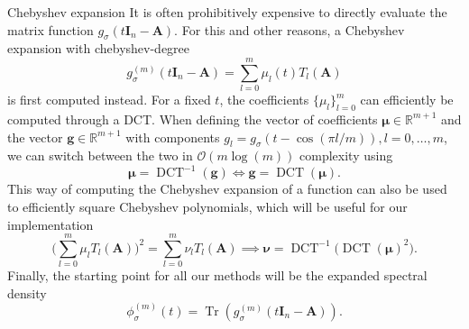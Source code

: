 \documentclass[final, leqno, 12pt]{beamer}
\newcommand{\mtx}[1]{\boldsymbol{#1}}
\newcommand{\vct}[1]{\boldsymbol{#1}}
\DeclareMathOperator{\Tr}{Tr}
\DeclareMathOperator{\DCT}{DCT}
\begin{document}
\begin{frame}[t]
\begin{columns}[t]
\begin{column}{0.45\paperwidth}
        \begin{block}{Chebyshev expansion}
            It is often prohibitively expensive to directly
            evaluate the matrix function $g_{\sigma}(t\mtx{I}_n - \mtx{A})$.
            For this and other reasons, a Chebyshev expansion with \gls{chebyshev-degree}
            \begin{equation}
                g_{\sigma}^{(m)}(t \mtx{I}_n - \mtx{A}) = \sum_{l=0}^{m} \mu_l(t) T_l(\mtx{A})
                \label{equ:chebyshev-expansion}
            \end{equation}
            is first computed instead. For a fixed $t$, the coefficients $\{\mu_l\}_{l=0}^m$ can
            efficiently be computed through a \gls{DCT}.
            When defining the vector of coefficients $\vct{\mu} \in \mathbb{R}^{m+1}$
            and the vector $\vct{g} \in \mathbb{R}^{m+1}$ with components
            $g_l = g_{\sigma}(t - \cos(\pi l / m)), l=0, \dots, m$, we can
            switch between the two in $\mathcal{O}(m \log(m))$ complexity using
            \begin{equation}
                \vct{\mu} = \DCT^{-1}(\vct{g}) \iff \vct{g} = \DCT(\vct{\mu}).
                \label{equ:DCT}
            \end{equation}
            This way of computing the Chebyshev expansion of a function
            can also be used to efficiently square Chebyshev polynomials,
            which will be useful for our implementation
            \begin{equation}
                \big(\sum_{l=0}^{m} \mu_l T_l(\mtx{A})\big)^2 = \sum_{l=0}^{m} \nu_l T_l(\mtx{A}) \implies \vct{\nu} = \DCT^{-1}\big(\DCT(\vct{\mu})^2\big).
                \label{equ:DCT-squaring}
            \end{equation}
            Finally, the starting point for all our methods will be the expanded spectral density
            \begin{equation}
                \phi_{\sigma}^{(m)}(t) = \Tr(g_{\sigma}^{(m)}(t \mtx{I}_n - \mtx{A})).
                \label{equ:expanded-spectral-density}
            \end{equation}
        \end{block}

    \end{column}
\end{columns}


\end{frame}
\end{document}

